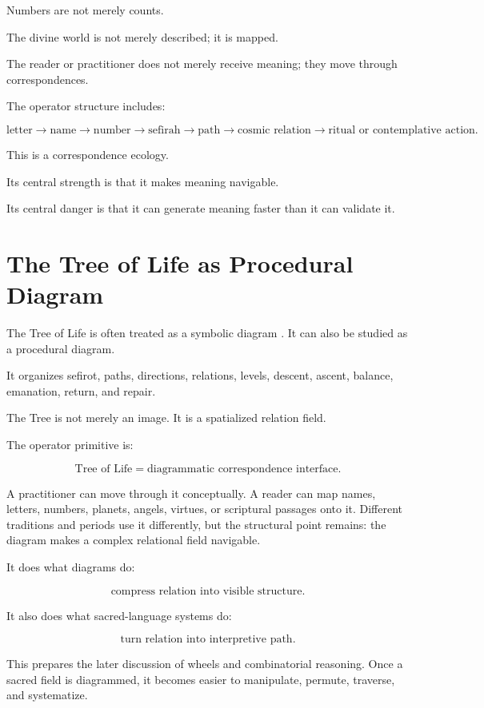 \documentclass[11pt]{book}
\begin{document}
Numbers are not merely counts.

The divine world is not merely described; it is mapped.

The reader or practitioner does not merely receive meaning; they move through correspondences.

The operator structure includes:

\[
\text{letter}
\rightarrow
\text{name}
\rightarrow
\text{number}
\rightarrow
\text{sefirah}
\rightarrow
\text{path}
\rightarrow
\text{cosmic relation}
\rightarrow
\text{ritual or contemplative action}.
\]

This is a correspondence ecology.

Its central strength is that it makes meaning navigable.

Its central danger is that it can generate meaning faster than it can validate it.

\section{The Tree of Life as Procedural Diagram}

The Tree of Life is often treated as a symbolic diagram \cite{Scholem1974Kabbalah,Idel1988KabbalahNewPerspectives}. It can also be studied as a procedural diagram.

It organizes sefirot, paths, directions, relations, levels, descent, ascent, balance, emanation, return, and repair.

The Tree is not merely an image. It is a spatialized relation field.

The operator primitive is:

\[
\text{Tree of Life} = \text{diagrammatic correspondence interface}.
\]

A practitioner can move through it conceptually. A reader can map names, letters, numbers, planets, angels, virtues, or scriptural passages onto it. Different traditions and periods use it differently, but the structural point remains: the diagram makes a complex relational field navigable.

It does what diagrams do:

\[
\text{compress relation into visible structure}.
\]

It also does what sacred-language systems do:

\[
\text{turn relation into interpretive path}.
\]

This prepares the later discussion of wheels and combinatorial reasoning. Once a sacred field is diagrammed, it becomes easier to manipulate, permute, traverse, and systematize.
\end{document}
